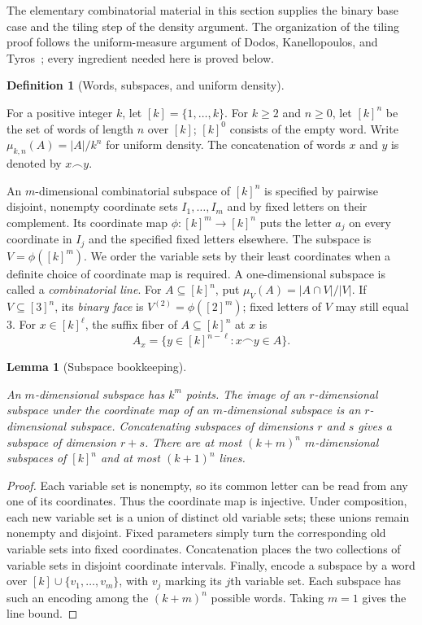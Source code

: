 \documentclass[11pt]{amsart}
\newtheorem{lemma}[theorem]{Lemma}
\theoremstyle{definition}
\newtheorem{definition}[theorem]{Definition}
\theoremstyle{remark}
\numberwithin{equation}{section}
\providecommand{\lean}[1]{}
\providecommand{\leanok}{}
\begin{document}
The elementary combinatorial material in this section supplies the binary
base case and the tiling step of the density argument.  The organization
of the tiling proof follows the uniform-measure argument of
Dodos, Kanellopoulos, and Tyros~\cite{DKT}; every ingredient needed here is proved
below.

\begin{definition}[Words, subspaces, and uniform density]\label{cj:def-words}
\lean{Auto.unifDensity,Auto.subspacePts,Auto.relDensity,Auto.binEmb,Auto.binaryCube,Auto.binaryFace,Auto.concatW,Auto.suffixFiber,Auto.ContainsSubspace,Auto.ContainsLine}
For a positive integer $k$, let $[k]=\{1,\ldots,k\}$.
For $k\ge2$ and $n\ge0$, let
$[k]^n$ be the set of words of length $n$ over $[k]$; $[k]^0$ consists
of the empty word.  Write $\mu_{k,n}(A)=|A|/k^n$ for uniform density.
The concatenation of words $x$ and $y$ is denoted by $x\frown y$.

An $m$-dimensional combinatorial subspace of $[k]^n$ is specified by
pairwise disjoint, nonempty coordinate sets $I_1,\ldots,I_m$ and by
fixed letters on their complement.  Its coordinate map
$\phi:[k]^m\longrightarrow[k]^n$ puts the letter $a_j$ on every
coordinate in $I_j$ and the specified fixed letters elsewhere.  The
subspace is $V=\phi([k]^m)$.  We order the variable sets by their least
coordinates when a definite choice of coordinate map is required.
A one-dimensional subspace is called a \emph{combinatorial line}.
For $A\subseteq[k]^n$, put
$\mu_V(A)=|A\cap V|/|V|$.
If $V\subseteq[3]^n$, its \emph{binary face} is
$V^{(2)}=\phi([2]^m)$; fixed letters of $V$ may still equal $3$.
For $x\in[k]^\ell$, the suffix fiber of $A\subseteq[k]^n$ at $x$ is
\[
 A_x=\{y\in[k]^{n-\ell}:x\frown y\in A\}.
\]
\end{definition}

\begin{lemma}[Subspace bookkeeping]\label{cj:bookkeeping}
\lean{Auto.cj_bookkeeping_card,Auto.cj_bookkeeping_comp,Auto.cj_bookkeeping_concat,Auto.cj_bookkeeping_count_subspaces,Auto.cj_bookkeeping_count_lines}
\leanok
An $m$-dimensional subspace has $k^m$ points.  The image of an
$r$-dimensional subspace under the coordinate map of an
$m$-dimensional subspace is an $r$-dimensional subspace.  Concatenating
subspaces of dimensions $r$ and $s$ gives a subspace of dimension $r+s$.
There are at most $(k+m)^n$ $m$-dimensional subspaces of $[k]^n$ and
at most $(k+1)^n$ lines.
\end{lemma}
\begin{proof}
Each variable set is nonempty, so its common letter can be read from
any one of its coordinates.  Thus the coordinate map is injective.
Under composition, each new variable set is a union of distinct old
variable sets; these unions remain nonempty and disjoint.  Fixed
parameters simply turn the corresponding old variable sets into fixed
coordinates.  Concatenation places the two collections of variable
sets in disjoint coordinate intervals.  Finally, encode a subspace
by a word over $[k]\cup\{v_1,\ldots,v_m\}$, with $v_j$ marking its
$j$th variable set.  Each subspace has such an encoding among the
$(k+m)^n$ possible words.  Taking $m=1$ gives the line bound.
\end{proof}
\end{document}
